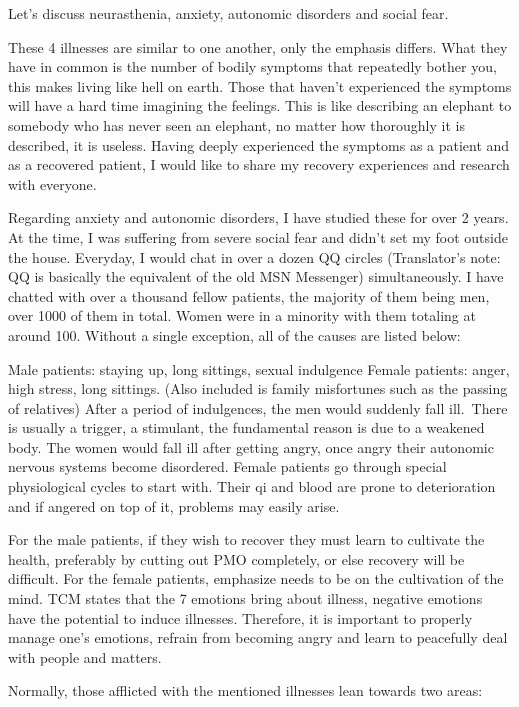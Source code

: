 \documentclass[
]{book}
\begin{document}
Let's discuss neurasthenia, anxiety, autonomic disorders and social fear.

These 4 illnesses are similar to one another, only the emphasis differs. What they have in common is the number of bodily symptoms that repeatedly bother you, this makes living like hell on earth. Those that haven't experienced the symptoms will have a hard time imagining the feelings. This is like describing an elephant to somebody who has never seen an elephant, no matter how thoroughly it is described, it is useless. Having deeply experienced the symptoms as a patient and as a recovered patient, I would like to share my recovery experiences and research with everyone.

Regarding anxiety and autonomic disorders, I have studied these for over 2 years. At the time, I was suffering from severe social fear and didn't set my foot outside the house. Everyday, I would chat in over a dozen QQ circles (Translator's note: QQ is basically the equivalent of the old MSN Messenger) simultaneously. I have chatted with over a thousand fellow patients, the majority of them being men, over 1000 of them in total. Women were in a minority with them totaling at around 100. Without a single exception, all of the causes are listed below:

Male patients: staying up, long sittings, sexual indulgence
Female patients: anger, high stress, long sittings. (Also included is family misfortunes such as the passing of relatives)
After a period of indulgences, the men would suddenly fall ill.~There is usually a trigger, a stimulant, the fundamental reason is due to a weakened body. The women would fall ill after getting angry, once angry their autonomic nervous systems become disordered. Female patients go through special physiological cycles to start with. Their qi and blood are prone to deterioration and if angered on top of it, problems may easily arise.

For the male patients, if they wish to recover they must learn to cultivate the health, preferably by cutting out PMO completely, or else recovery will be difficult. For the female patients, emphasize needs to be on the cultivation of the mind. TCM states that the 7 emotions bring about illness, negative emotions have the potential to induce illnesses. Therefore, it is important to properly manage one's emotions, refrain from becoming angry and learn to peacefully deal with people and matters.

Normally, those afflicted with the mentioned illnesses lean towards two areas:
\end{document}
